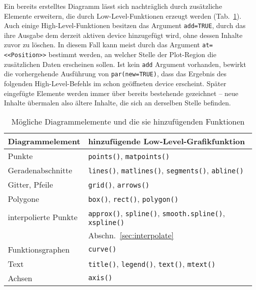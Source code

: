 Ein bereits erstelltes Diagramm lässt sich nachträglich durch zusätzliche Elemente erweitern, die durch Low-Level-Funktionen erzeugt werden (Tab.\ \ref{tab:addGraphElems}). Auch einige High-Level-Funktionen besitzen das Argument \lstinline!add=TRUE!, durch das ihre Ausgabe dem derzeit aktiven device hinzugefügt wird, ohne dessen Inhalte zuvor zu löschen. In diesem Fall kann meist durch das Argument \lstinline!at=<<Position>>! bestimmt werden, an welcher Stelle der Plot-Region die zusätzlichen Daten erscheinen sollen. Ist kein \lstinline!add! Argument vorhanden, bewirkt die vorhergehende Ausführung von \lstinline!par(new=TRUE)!, dass das Ergebnis des folgenden High-Level-Befehls im schon geöffneten device erscheint. Später eingefügte Elemente werden immer über bereits bestehende gezeichnet -- neue Inhalte übermalen also ältere Inhalte, die sich an derselben Stelle befinden.

\begin{table}[ht]
\centering
\caption{Mögliche Diagrammelemente und die sie hinzufügenden Funktionen}
\label{tab:addGraphElems}
\begin{tabular}{p{3.5cm}p{9cm}}
\hline
\sffamily Diagrammelement & \sffamily hinzufügende Low-Level-Grafikfunktion\\\hline\hline
Punkte & \lstinline!points()!, \lstinline!matpoints()!\\
Geradenabschnitte & \lstinline!lines()!, \lstinline!matlines()!, \lstinline!segments()!, \lstinline!abline()!\\
Gitter, Pfeile & \lstinline!grid()!, \lstinline!arrows()!\\
Polygone & \lstinline!box()!, \lstinline!rect()!, \lstinline!polygon()!\\
interpolierte Punkte & \lstinline!approx()!, \lstinline!spline()!, \lstinline!smooth.spline()!, \lstinline!xspline()!\\
                     & Abschn.\ \ref{sec:interpolate}\\
Funktionsgraphen & \lstinline!curve()!\\
Text & \lstinline!title()!, \lstinline!legend()!, \lstinline!text()!, \lstinline!mtext()!\\
Achsen & \lstinline!axis()!\\\hline
\end{tabular}
\end{table}

